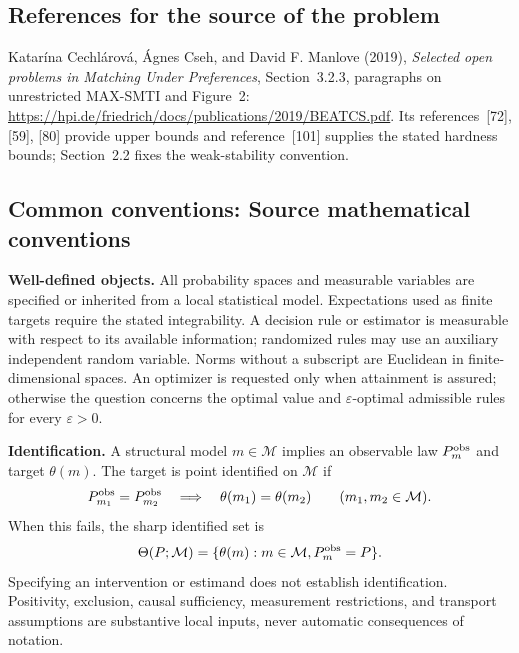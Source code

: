 \documentclass[11pt,a4paper]{article}
\begin{document}
\subsection*{References for the source of the problem}
Katar\'ina Cechl\'arov\'a, \'Agnes Cseh, and David F. Manlove (2019), \emph{Selected open problems in Matching Under Preferences}, Section~3.2.3, paragraphs on unrestricted MAX-SMTI and Figure~2: \url{https://hpi.de/friedrich/docs/publications/2019/BEATCS.pdf}. Its references~[72], [59], [80] provide upper bounds and reference~[101] supplies the stated hardness bounds; Section~2.2 fixes the weak-stability convention.

\subsection*{Common conventions: Source mathematical conventions}

\textbf{Well-defined objects.}
All probability spaces and measurable variables are specified or inherited
from a local statistical model. Expectations used as finite targets require
the stated integrability. A decision rule or estimator is measurable with
respect to its available information; randomized rules may use an auxiliary
independent random variable. Norms without a subscript are Euclidean in
finite-dimensional spaces. An optimizer is requested only when attainment
is assured; otherwise the question concerns the optimal value and
$\varepsilon$-optimal admissible rules for every $\varepsilon>0$.

\textbf{Identification.}
A structural model $m\in\mathcal M$ implies an observable law
$P_m^{\rm obs}$ and target $\theta(m)$. The target is point identified on
$\mathcal M$ if
\[
 P_{m_1}^{\rm obs}=P_{m_2}^{\rm obs}
 \quad\Longrightarrow\quad\theta(m_1)=\theta(m_2)
 \qquad(m_1,m_2\in\mathcal M).
\]
When this fails, the sharp identified set is
\[
 \Theta(P;\mathcal M)=\{\theta(m):m\in\mathcal M,
                                  P_m^{\rm obs}=P\}.
\]
Specifying an intervention or estimand does not establish identification.
Positivity, exclusion, causal sufficiency, measurement restrictions, and
transport assumptions are substantive local inputs, never automatic
consequences of notation.
\end{document}
